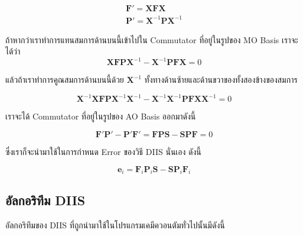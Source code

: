\begin{gather}
  \mathbf{F'} = \mathbf{X} \mathbf{F} \mathbf{X} \\
  \mathbf{P'} = \mathbf{X}^{-1} \mathbf{P} \mathbf{X}^{-1}
\end{gather}

\noindent ถ้าหากว่าเราทำการแทนสมการด้านบนนี้เข้าไปใน Commutator ที่อยู่ในรูปของ MO Basis เราจะได้ว่า
\begin{equation}
  \mathbf{X} \mathbf{F} \mathbf{P} \mathbf{X}^{-1} - \mathbf{X}^{-1} \mathbf{P} \mathbf{F} \mathbf{X}
  =
  0
\end{equation}

\noindent แล้วถ้าเราทำการคูณสมการด้านบนนี้ด้วย $\mathbf{X}^{-1}$ ทั้งทางด้านซ้ายและด้านขวาของทั้งสองข้างของสมการ

\begin{equation}
  \mathbf{X}^{-1} \mathbf{X} \mathbf{F} \mathbf{P} \mathbf{X}^{-1} \mathbf{X}^{-1}
  -
  \mathbf{X}^{-1} \mathbf{X}^{-1} \mathbf{P} \mathbf{F} \mathbf{X} \mathbf{X}^{-1}
  =
  0
\end{equation}

\noindent เราจะได้ Commutator ที่อยู่ในรูปของ AO Basis ออกมาดังนี้

\begin{equation}
  \mathbf{F'}\mathbf{P'} - \mathbf{P'}\mathbf{F'}
  =
  \mathbf{F} \mathbf{P} \mathbf{S} - \mathbf{S} \mathbf{P} \mathbf{F}
  =
  0
\end{equation}

\noindent ซึ่งเราก็จะนำมาใช้ในการกำหนด Error ของวิธี DIIS นั่นเอง ดังนี้

\begin{equation}
  \label{eq:diis_error_hf}
  \mathbf{e}_i
  =
  \mathbf{F}_i \mathbf{P}_i \mathbf{S} - \mathbf{S} \mathbf{P}_i \mathbf{F}_i
\end{equation}

\subsection{อัลกอริทึม DIIS}

อัลกอริทึมของ DIIS ที่ถูกนำมาใช้ในโปรแกรมเคมีควอนตัมทั่วไปนั้นมีดังนี้

